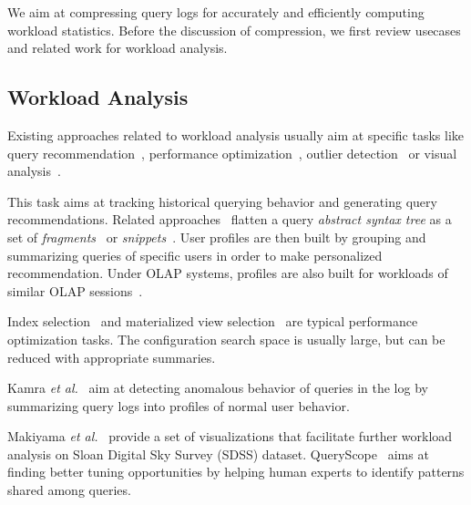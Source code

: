 We aim at compressing query logs for accurately and efficiently computing workload statistics.
Before the discussion of compression, we first review usecases and related work for workload analysis.

\subsection{Workload Analysis}
Existing approaches related to workload analysis usually aim at specific tasks like query recommendation~\cite{DBLP:conf/icdm/MittalVCEP10,DBLP:journals/jdwm/GiacomettiMNS11,DBLP:journals/pvldb/KhoussainovaKBS11,DBLP:conf/icde/YangPS09,DBLP:journals/kais/AligonGMRT14}, performance optimization~\cite{DBLP:conf/adbis/AouicheJD06,DBLP:conf/sigmod/BrunoCG01}, outlier detection~\cite{DBLP:journals/vldb/KamraTB08} or visual analysis~\cite{DBLP:conf/simbig/MakiyamaRS15}. 

This task aims at tracking historical querying behavior and generating query recommendations.
Related approaches~\cite{DBLP:conf/icdm/MittalVCEP10,DBLP:journals/pvldb/KhoussainovaKBS11} flatten a query \textit{abstract syntax tree} as a set of \textit{fragments}~\cite{DBLP:conf/icdm/MittalVCEP10} or \textit{snippets}~\cite{DBLP:journals/pvldb/KhoussainovaKBS11}.
User profiles are then built by grouping and summarizing queries of specific users in order to make personalized recommendation. 
Under OLAP systems, profiles are also built for workloads of similar OLAP sessions~\cite{DBLP:journals/kais/AligonGMRT14}.

Index selection~\cite{DBLP:conf/vldb/ChaudhuriN97,DBLP:journals/tods/FinkelsteinST88} and materialized view selection~\cite{DBLP:conf/vldb/AgrawalCN00,DBLP:conf/adbis/AouicheJD06,DBLP:conf/sigmod/BrunoCG01} are typical performance optimization tasks.
The configuration search space is usually large, but can be reduced with appropriate summaries.

Kamra \textit{et al.}~\cite{DBLP:journals/vldb/KamraTB08} aim at detecting anomalous behavior of queries in the log by summarizing query logs into profiles
of normal user behavior.

Makiyama \textit{et al.}~\cite{DBLP:conf/simbig/MakiyamaRS15} provide a set of visualizations that facilitate further workload analysis on Sloan Digital Sky Survey (SDSS) dataset.
QueryScope~\cite{DBLP:journals/pvldb/HuRCLZ08} aims at finding better tuning opportunities by helping human experts to identify patterns shared among queries. 
%

